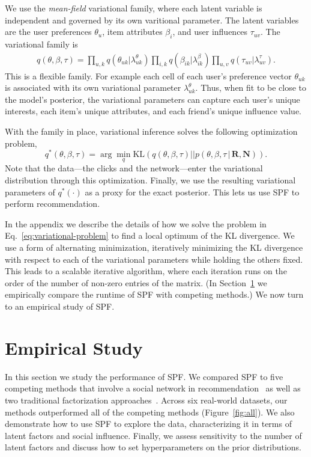 \documentclass{sig-alternate-2013}
\newcommand{\g}{\, | \,}
\begin{document}
We use the \textit{mean-field} variational family, where each latent
variable is independent and governed by its own varitional parameter.
The latent variables are the user preferences $\theta_u$, item
attributes $\beta_i$, and user influences $\tau_{uv}$.  The
variational family is
\begin{align}
  \label{eq:variational-distribution}
  q(\theta, \beta, \tau) = \prod_{u,k} q(\theta_{uk} \vert \lambda^\theta_{uk})
  \prod_{i,k} q(\beta_{ik} \vert \lambda^\beta_{ik})
  \prod_{u,v} q(\tau_{uv} \vert \lambda^\tau_{uv}).
\end{align}
This is a flexible family.  For example each cell of each user's
preference vector $\theta_{uk}$ is associated with its own variational
parameter $\lambda^\theta_{uk}$.  Thus, when fit to be close to the
model's posterior, the variational parameters can capture each user's
unique interests, each item's unique attributes, and each friend's
unique influence value.

With the family in place, variational inference solves the following
optimization problem,
\begin{equation}
  \label{eq:variational-problem}
  q^*(\theta, \beta, \tau) =
  \arg \min_{q} \mathrm{KL}\left(q(\theta, \beta, \tau) || p(\theta,
    \beta, \tau \g \mathbf{R}, \mathbf{N})\right).
\end{equation}
Note that the data---the clicks and the network---enter the
variational distribution through this optimization.  Finally, we use
the resulting variational parameters of $q^*(\cdot)$ as a proxy for
the exact posterior.  This lets us use SPF to perform recommendation.

In the appendix we describe the details of how we
solve the problem in Eq.~\ref{eq:variational-problem} to find a local
optimum of the KL divergence.  We use a form of alternating
minimization, iteratively minimizing the KL divergence with respect to
each of the variational parameters while holding the others fixed.
This leads to a scalable iterative algorithm, where each iteration
runs on the order of the number of non-zero entries of the matrix.
(In Section~\ref{sec:eval} we empirically compare the runtime of SPF
with competing methods.)  We now turn to an empirical study of SPF.


\section{Empirical Study}
\label{sec:eval}
In this section we study the performance of SPF.  We compared SPF to
five competing methods that involve a social network in
recommendation~\cite{guo2015trustsvd,Jamali:2010,Ma:2009,SoRec,Yang2013}
as well as two traditional factorization approaches~\cite{poisMF,PMF}.
Across six real-world datasets, our methods outperformed all of the
competing methods (Figure~\ref{fig:all}).  We also demonstrate how to
use SPF to explore the data, characterizing it in terms of latent
factors and social influence.  Finally, we assess sensitivity to the
number of latent factors and discuss how to set hyperparameters on the
prior distributions.
\end{document}
